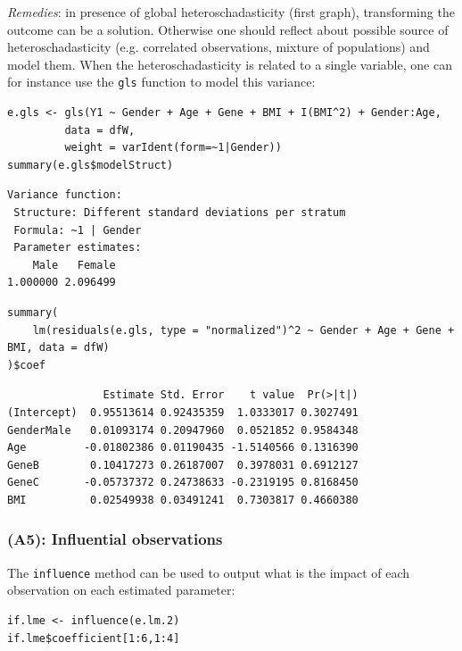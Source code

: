 \documentclass[12pt]{article}
\begin{document}
\emph{Remedies}: in presence of global heteroschadasticity (first graph),
transforming the outcome can be a solution. Otherwise one should
reflect about possible source of heteroschadasticity (e.g. correlated
observations, mixture of populations) and model them. When the
heteroschadasticity is related to a single variable, one can for
instance use the \texttt{gls} function to model this variance:

\clearpage

\lstset{language=r,label= ,caption= ,captionpos=b,numbers=none}
\begin{lstlisting}
e.gls <- gls(Y1 ~ Gender + Age + Gene + BMI + I(BMI^2) + Gender:Age, 
	     data = dfW,
	     weight = varIdent(form=~1|Gender))
summary(e.gls$modelStruct)
\end{lstlisting}

\begin{verbatim}
Variance function:
 Structure: Different standard deviations per stratum
 Formula: ~1 | Gender 
 Parameter estimates:
    Male   Female 
1.000000 2.096499
\end{verbatim}

\lstset{language=r,label= ,caption= ,captionpos=b,numbers=none}
\begin{lstlisting}
summary(
    lm(residuals(e.gls, type = "normalized")^2 ~ Gender + Age + Gene + BMI, data = dfW)
)$coef
\end{lstlisting}

\begin{verbatim}
               Estimate Std. Error    t value  Pr(>|t|)
(Intercept)  0.95513614 0.92435359  1.0333017 0.3027491
GenderMale   0.01093174 0.20947960  0.0521852 0.9584348
Age         -0.01802386 0.01190435 -1.5140566 0.1316390
GeneB        0.10417273 0.26187007  0.3978031 0.6912127
GeneC       -0.05737372 0.24738633 -0.2319195 0.8168450
BMI          0.02549938 0.03491241  0.7303817 0.4660380
\end{verbatim}


\subsubsection{\textbf{(A5)}: Influential observations}
\label{sec:org988ae93}

The \texttt{influence} method can be used to output what is the impact of
each observation on each estimated parameter:
\lstset{language=r,label= ,caption= ,captionpos=b,numbers=none}
\begin{lstlisting}
if.lme <- influence(e.lm.2)
if.lme$coefficient[1:6,1:4]
\end{lstlisting}
\end{document}
